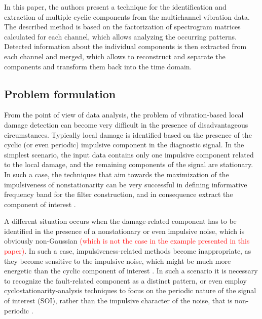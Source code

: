 \documentclass[3p,12pt]{elsarticle}
\begin{document}
In this paper, the authors present a technique for the identification and extraction of multiple cyclic components from the multichannel vibration data. The described method is based on the factorization of spectrogram matrices calculated for each channel, which allows analyzing the occurring patterns. Detected information about the individual components is then extracted from each channel and merged, which allows to reconstruct and separate the components and transform them back into the time domain. 


\subsection{Problem formulation}


From the point of view of data analysis, the problem of vibration-based local damage detection can become very difficult in the presence of disadvantageous circumstances. Typically local damage is identified based on the presence of the cyclic (or even periodic) impulsive component in the diagnostic signal. In the simplest scenario, the input data contains only one impulsive component related to the local damage, and the remaining components of the signal are stationary. In such a case, the techniques that aim towards the maximization of the impulsiveness of nonstationarity can be very successful in defining informative frequency band for the filter construction, and in consequence extract the component of interest \cite{combet2009optimal,wodecki2017local}. 

A different situation occurs when the damage-related component has to be identified in the presence of a nonstationary or even impulsive noise, which is obviously non-Gaussian \textcolor{red}{(which is not the case in the example presented in this paper)}. In such a case, impulsiveness-related methods become inappropriate, as they become sensitive to the impulsive noise, which might be much more energetic than the cyclic component of interest \cite{wodecki2019novel,wylomanska2016impulsive,tran2001method}. In such a scenario it is necessary to recognize the fault-related component as a distinct pattern, or even employ cyclostationarity-analysis techniques to focus on the periodic nature of the signal of interest (SOI), rather than the impulsive character of the noise, that is non-periodic \cite{antoni2004cyclostationary}.
\end{document}
